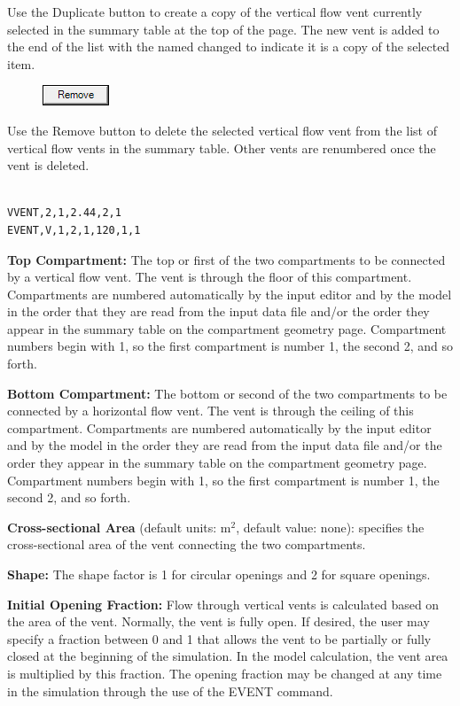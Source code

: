 Use the Duplicate button to create a copy of the vertical flow vent currently selected in the summary table at the top of the page. The new vent is added to the end of the list with the named changed to indicate it is a copy of the selected item. \\

\begin{figure}
  \includegraphics[width=0.781in]{FIGURES/Input_File/Remove_Button}
\end{figure}

Use the Remove button to delete the selected vertical flow vent from the list of vertical flow vents in the summary table.  Other vents are renumbered once the vent is deleted. \\~ \\

\begin{lstlisting}
VVENT,2,1,2.44,2,1
EVENT,V,1,2,1,120,1,1
\end{lstlisting}

\textbf{Top Compartment:} The top or first of the two compartments to be connected by a vertical flow vent. The vent is through the floor of this compartment.  Compartments are numbered automatically by the input editor and by the model in the order that they are read from the input data file and/or the order they appear in the summary table on the compartment geometry page. Compartment numbers begin with 1, so the first compartment is number 1, the second 2, and so forth.

\textbf{Bottom Compartment:} The bottom or second of the two compartments to be connected by a horizontal flow vent. The vent is through the ceiling of this compartment. Compartments are numbered automatically by the input editor and by the model in the order they are read from the input data file and/or the order they appear in the summary table on the compartment geometry page. Compartment numbers begin with 1, so the first compartment is number 1, the second 2, and so forth.

\textbf{Cross-sectional Area} (default units: m$^2$, default value: none): specifies the cross-sectional area of the vent connecting the two compartments.

\textbf{Shape:} The shape factor is 1 for circular openings and 2 for square openings.

\textbf{Initial Opening Fraction:} Flow through vertical vents is calculated based on the area of the vent.  Normally, the vent is fully open.  If desired, the user may specify a fraction between 0 and 1 that allows the vent to be partially or fully closed at the beginning of the simulation.  In the model calculation, the vent area is multiplied by this fraction.  The opening fraction may be changed at any time in the simulation through the use of the EVENT command.

